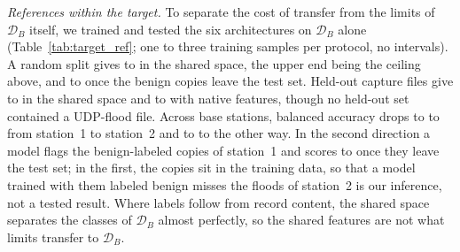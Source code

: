 \documentclass{ieeeaccess}
\newcommand{\DB}{\ensuremath{\mathcal{D}_{B}}}
\begin{document}
\emph{References within the target.} To separate the cost of transfer from the limits of \DB{} itself, we trained and tested the six architectures on \DB{} alone (Table~\ref{tab:target_ref}; one to three training samples per protocol, no intervals). A random split gives \TgtRandShBAmin{} to \TgtRandShBAmax{} in the shared space, the upper end being the ceiling above, and \TgtRandShCleanBAmin{} to \TgtRandShCleanBAmax{} once the benign copies leave the test set. Held-out capture files give \TgtFileShBAmin{} to \TgtFileShBAmax{} in the shared space and \TgtFileNatBAmin{} to \TgtFileNatBAmax{} with native features, though no held-out set contained a UDP-flood file. Across base stations, balanced accuracy drops to \TgtSiteABShBAmin{} to \TgtSiteABShBAmax{} from station~1 to station~2 and to \TgtSiteBAShBAmin{} to \TgtSiteBAShBAmax{} the other way. In the second direction a model flags the benign-labeled copies of station~1 and scores \TgtSiteBAShCleanBAmin{} to \TgtSiteBAShCleanBAmax{} once they leave the test set; in the first, the copies sit in the training data, so that a model trained with them labeled benign misses the floods of station~2 is our inference, not a tested result. Where labels follow from record content, the shared space separates the classes of \DB{} almost perfectly, so the shared features are not what limits transfer to \DB{}.
\end{document}
